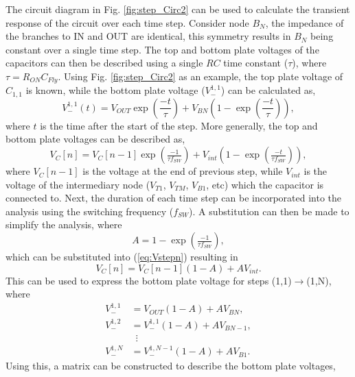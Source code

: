 \documentclass[conference]{IEEEtran}
\begin{document}
	The circuit diagram in Fig. \ref{fig:step_Circ2} can be used to calculate the transient response of the circuit over each time step. Consider node $B_N$, the impedance of the branches to IN and OUT are identical, this symmetry results in $B_N$ being constant over a single time step. The top and bottom plate voltages of the capacitors can then be described using a single $RC$ time constant ($\tau$), where $\tau = R_{ON}C_{Fly}$. Using Fig. \ref{fig:step_Circ2} as an example, the top plate voltage of $C_{1,1}$ is known, while the bottom plate voltage ($V_{-}^{1,1}$) can be calculated as,
	\begin{equation}
	V_{-}^{1,1}(t) = V_{OUT}\exp\left(\frac{-t}{\tau}\right) + V_{BN}\left(1-\exp\left(\frac{-t}{\tau}\right)\right),
	\end{equation}
	where $t$ is the time after the start of the step. More generally, the top and bottom plate voltages can be described as,
	\begin{equation}
	V_{C}[n]\! =\! V_{C}[n\!-\!1]\exp\left(\tfrac{-1}{\tau f_{SW}}\right) + V_{int}\!\left(1-\exp\left(\tfrac{-t}{\tau f_{SW}}\right)\right),
	\label{eq:Vstepn}
	\end{equation}
	where $V_{C}[n-1]$ is the voltage at the end of previous step, while $V_{int}$ is the voltage of the intermediary node ($V_{T1}$, $V_{TM}$, $V_{B1}$, etc) which the capacitor is connected to. Next, the duration of each time step can be incorporated into the analysis using the switching frequency ($f_{SW}$). A substitution can then be made to simplify the analysis, where
	\begin{equation}
	A = 1-\exp\left(\tfrac{-1}{\tau f_{SW}}\right),
	\label{eq:A}
	\end{equation}
	which can be substituted into (\ref{eq:Vstepn}) resulting in
	\begin{equation}
		V_{C}[n] = V_C[n-1](1-A) + AV_{int}.
	\end{equation}
	This can be used to express the bottom plate voltage for steps (1,1)$\rightarrow $(1,N), where
	\begin{equation}
	\begin{split}
	V_-^{1,1} &= V_{OUT}(1-A) + AV_{BN},\\
	V_-^{1,2} &= V_-^{1,1}(1-A) + AV_{BN-1},\\
	& \,\,\,\vdots\\
	V_{-}^{1,N} &= V_-^{1,N-1}(1-A) + AV_{B1}.
	\end{split}		
	\end{equation}
	Using this, a matrix can be constructed to describe the bottom plate voltages,
	
\end{document}
